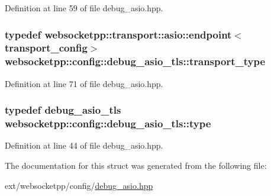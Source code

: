 Definition at line 59 of file debug\+\_\+asio.\+hpp.

\hypertarget{structwebsocketpp_1_1config_1_1debug__asio__tls_a9c9369aef0a393f0293d8a4a6192aaff}{}
\subsubsection[{transport\+\_\+type}]{\setlength{\rightskip}{0pt plus 5cm}typedef {\bf websocketpp\+::transport\+::asio\+::endpoint}$<${\bf transport\+\_\+config}$>$ {\bf websocketpp\+::config\+::debug\+\_\+asio\+\_\+tls\+::transport\+\_\+type}}\label{structwebsocketpp_1_1config_1_1debug__asio__tls_a9c9369aef0a393f0293d8a4a6192aaff}


Definition at line 71 of file debug\+\_\+asio.\+hpp.

\hypertarget{structwebsocketpp_1_1config_1_1debug__asio__tls_a27552c8bb63f5e5c4842be762a85739d}{}
\subsubsection[{type}]{\setlength{\rightskip}{0pt plus 5cm}typedef {\bf debug\+\_\+asio\+\_\+tls} {\bf websocketpp\+::config\+::debug\+\_\+asio\+\_\+tls\+::type}}\label{structwebsocketpp_1_1config_1_1debug__asio__tls_a27552c8bb63f5e5c4842be762a85739d}


Definition at line 44 of file debug\+\_\+asio.\+hpp.



The documentation for this struct was generated from the following file\+:\begin{DoxyCompactItemize}
\item 
ext/websocketpp/config/\hyperlink{debug__asio_8hpp}{debug\+\_\+asio.\+hpp}\end{DoxyCompactItemize}
